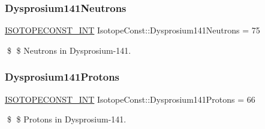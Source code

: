 \subsubsection{\texorpdfstring{Dysprosium141\+Neutrons}{Dysprosium141Neutrons}}
{\footnotesize\ttfamily \mbox{\hyperlink{group___isotope_const-_macros_ga5f18360b3e99483a35c32d789e62621c}{I\+S\+O\+T\+O\+P\+E\+C\+O\+N\+S\+T\+\_\+\+I\+NT}} Isotope\+Const\+::\+Dysprosium141\+Neutrons = 75}

\$ \$ Neutrons in Dysprosium-\/141. \mbox{\label{group___isotope_const-_dysprosium-_dy141_ga23f509ad63301e568bff1a1cfd65fd26}} 
\subsubsection{\texorpdfstring{Dysprosium141\+Protons}{Dysprosium141Protons}}
{\footnotesize\ttfamily \mbox{\hyperlink{group___isotope_const-_macros_ga5f18360b3e99483a35c32d789e62621c}{I\+S\+O\+T\+O\+P\+E\+C\+O\+N\+S\+T\+\_\+\+I\+NT}} Isotope\+Const\+::\+Dysprosium141\+Protons = 66}

\$ \$ Protons in Dysprosium-\/141. 
